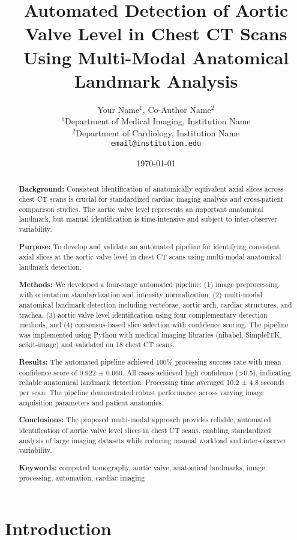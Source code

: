 \documentclass[11pt,a4paper]{article}
\title{Automated Detection of Aortic Valve Level in Chest CT Scans Using Multi-Modal Anatomical Landmark Analysis}
\author{
Your Name$^{1}$, Co-Author Name$^{2}$ \\
$^{1}$Department of Medical Imaging, Institution Name \\
$^{2}$Department of Cardiology, Institution Name \\
\texttt{email@institution.edu}
}
\date{\today}
\begin{document}
\maketitle

\begin{abstract}
\textbf{Background:} Consistent identification of anatomically equivalent axial slices across chest CT scans is crucial for standardized cardiac imaging analysis and cross-patient comparison studies. The aortic valve level represents an important anatomical landmark, but manual identification is time-intensive and subject to inter-observer variability.

\textbf{Purpose:} To develop and validate an automated pipeline for identifying consistent axial slices at the aortic valve level in chest CT scans using multi-modal anatomical landmark detection.

\textbf{Methods:} We developed a four-stage automated pipeline: (1) image preprocessing with orientation standardization and intensity normalization, (2) multi-modal anatomical landmark detection including vertebrae, aortic arch, cardiac structures, and trachea, (3) aortic valve level identification using four complementary detection methods, and (4) consensus-based slice selection with confidence scoring. The pipeline was implemented using Python with medical imaging libraries (nibabel, SimpleITK, scikit-image) and validated on 18 chest CT scans.

\textbf{Results:} The automated pipeline achieved 100\% processing success rate with mean confidence score of 0.922 ± 0.060. All cases achieved high confidence (>0.5), indicating reliable anatomical landmark detection. Processing time averaged 10.2 ± 4.8 seconds per scan. The pipeline demonstrated robust performance across varying image acquisition parameters and patient anatomies.

\textbf{Conclusions:} The proposed multi-modal approach provides reliable, automated identification of aortic valve level slices in chest CT scans, enabling standardized analysis of large imaging datasets while reducing manual workload and inter-observer variability.

\textbf{Keywords:} computed tomography, aortic valve, anatomical landmarks, image processing, automation, cardiac imaging
\end{abstract}

\section{Introduction}
\end{document}
